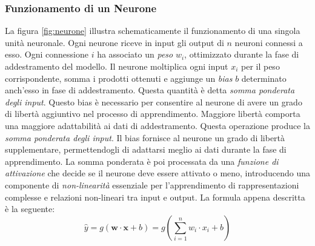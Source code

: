 \documentclass[12pt,a4paper,twoside,openright]{book}
\begin{document}
\subsubsection{Funzionamento di un Neurone}
La figura \ref{fig:neurone} illustra schematicamente il funzionamento di una singola unità neuronale. Ogni neurone riceve in input gli output di $n$ neuroni connessi a esso. Ogni connessione $i$ ha associato un \emph{peso} $w_i$, ottimizzato durante la fase di addestramento del modello. Il neurone moltiplica ogni input $x_i$ per il peso corrispondente, somma i prodotti ottenuti e aggiunge un \emph{bias} $b$ determinato anch'esso in fase di addestramento. Questa quantità è detta \emph{somma ponderata degli input}.
Questo bias è necessario per consentire al neurone di avere un grado di libertà aggiuntivo nel processo di apprendimento. Maggiore libertà comporta una maggiore adattabilità ai dati di addestramento.
Questa operazione produce la \emph{somma ponderata degli input}. Il bias fornisce al neurone un grado di libertà supplementare, permettendogli di adattarsi meglio ai dati durante la fase di apprendimento. La somma ponderata è poi processata da una \emph{funzione di attivazione} che decide se il neurone deve essere attivato o meno, introducendo una componente di \emph{non-linearità} essenziale per l'apprendimento di rappresentazioni complesse e relazioni non-lineari tra input e output. La formula appena descritta è la seguente:
\begin{equation*}
    \hat{y} = g(\mathbf{w \cdot x} + b) = g\left( \sum_{i=1}^n w_i \cdot x_i + b \right) 
\end{equation*}
\end{document}
